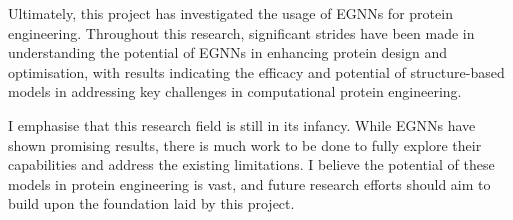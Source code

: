 Ultimately, this project has investigated the usage of EGNNs for protein engineering. Throughout this research, significant strides have been made in understanding the potential of EGNNs in enhancing protein design and optimisation, with results indicating the efficacy and potential of structure-based models in addressing key challenges in computational protein engineering.

I emphasise that this research field is still in its infancy. While EGNNs have shown promising results, there is much work to be done to fully explore their capabilities and address the existing limitations. I believe the potential of these models in protein engineering is vast, and future research efforts should aim to build upon the foundation laid by this project.